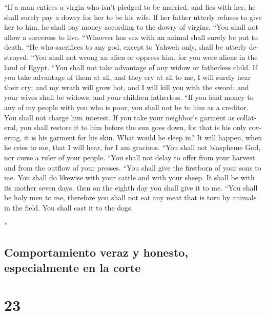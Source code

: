 \begin{paracol}{2}
\begin{otherlanguage}{english}
 ``If a man entices a virgin who isn't pledged to be
married, and lies with her, he shall surely pay a dowry for her to be
his wife.  If her father utterly refuses to give her to
him, he shall pay money according to the dowry of virgins.
 ``You shall not allow a sorceress to live.
 ``Whoever has sex with an animal shall surely be put to
death.  ``He who sacrifices to any god, except to Yahweh
only, shall be utterly destroyed.  ``You shall not wrong
an alien or oppress him, for you were aliens in the land of Egypt.
 ``You shall not take advantage of any widow or
fatherless child.  If you take advantage of them at all,
and they cry at all to me, I will surely hear their cry; 
and my wrath will grow hot, and I will kill you with the sword; and your
wives shall be widows, and your children fatherless. 
``If you lend money to any of my people with you who is poor, you shall
not be to him as a creditor. You shall not charge him interest.
 If you take your neighbor's garment as collateral, you
shall restore it to him before the sun goes down,  for
that is his only covering, it is his garment for his skin. What would he
sleep in? It will happen, when he cries to me, that I will hear, for I
am gracious.  ``You shall not blaspheme God, nor curse a
ruler of your people.  ``You shall not delay to offer
from your harvest and from the outflow of your presses. ``You shall give
the firstborn of your sons to me.  You shall do likewise
with your cattle and with your sheep. It shall be with its mother seven
days, then on the eighth day you shall give it to me. 
``You shall be holy men to me, therefore you shall not eat any meat that
is torn by animals in the field. You shall cast it to the dogs.

\end{otherlanguage}

\switchcolumn[0]*

\hypertarget{comportamiento-veraz-y-honesto-especialmente-en-la-corte}{%
\subsection{Comportamiento veraz y honesto, especialmente en la
corte}\label{comportamiento-veraz-y-honesto-especialmente-en-la-corte}}

\hypertarget{section-44}{%
\section{23}\label{section-44}}


\end{paracol}
